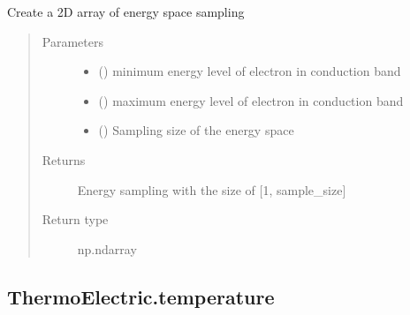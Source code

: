 \documentclass[letterpaper,10pt,english]{sphinxmanual}
\begin{document}
\begin{fulllineitems}
\label{\detokenize{autosummary/ThermoElectric.energy_range:ThermoElectric.energy_range}}
\sphinxAtStartPar
Create a 2D array of energy space sampling
\begin{quote}\begin{description}
\item[{Parameters}] \leavevmode\begin{itemize}
\item {} 
\sphinxAtStartPar
{} () \textendash{} minimum energy level of electron in conduction band

\item {} 
\sphinxAtStartPar
{} () \textendash{} maximum energy level of electron in conduction band

\item {} 
\sphinxAtStartPar
{} () \textendash{} Sampling size of the energy space

\end{itemize}

\item[{Returns}] \leavevmode
\sphinxAtStartPar
{} \textendash{} Energy sampling with the size of {[}1, sample\_size{]}

\item[{Return type}] \leavevmode
\sphinxAtStartPar
np.ndarray

\end{description}\end{quote}

\end{fulllineitems}



\subsection{ThermoElectric.temperature}
\label{\detokenize{autosummary/ThermoElectric.temperature:thermoelectric-temperature}}\label{\detokenize{autosummary/ThermoElectric.temperature::doc}}
\end{document}

